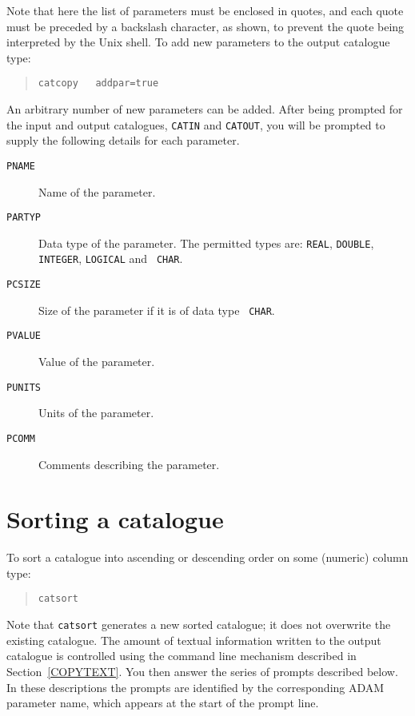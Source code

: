 \documentclass[twoside,11pt]{article}
\newcommand{\xlabel}[1]{}
\renewcommand{\_}{\texttt{\symbol{95}}}
\begin{document}
Note that here the list of parameters must be enclosed in quotes, and
each quote must be preceded by a backslash character, as shown, to prevent
the quote being interpreted by the Unix shell.  To add new parameters to
the output catalogue type:

\begin{verse}
{\tt catcopy ~ addpar=true}
\end{verse}

An arbitrary number of new parameters can be added.  After being prompted
for the input and output catalogues, {\tt CATIN} and {\tt CATOUT}, you will
be prompted to supply the following details for each parameter.

\begin{description}

  \item[ {\tt PNAME} ] Name of the parameter.

  \item[ {\tt PARTYP} ] Data type of the parameter.  The permitted types
   are: {\tt REAL}, {\tt DOUBLE}, {\tt INTEGER}, {\tt LOGICAL} and {\tt
   CHAR}.

  \item[ {\tt PCSIZE} ] Size of the parameter if it is of data type {\tt
   CHAR}.

  \item[ {\tt PVALUE} ] Value of the parameter.

  \item[ {\tt PUNITS} ] Units of the parameter.

  \item[ {\tt PCOMM} ] Comments describing the parameter.

\end{description}


\section{\xlabel{SORT}\label{SORT}Sorting a catalogue}

To sort a catalogue into ascending or descending order on some (numeric)
column type:

\begin{verse}
{\tt catsort}
\end{verse}

Note that {\tt catsort} generates a new sorted catalogue; it does not
overwrite the existing catalogue. The amount of textual information
written to the output catalogue is controlled using the command line
mechanism described in Section~\ref{COPYTEXT}.  You then answer the
series of prompts described below.  In these descriptions the prompts
are identified by the corresponding ADAM parameter name, which appears at
the start of the prompt line.
\end{document}
